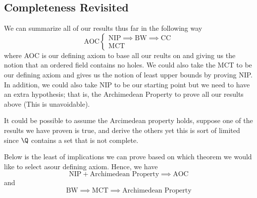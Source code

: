 \subsection{Completeness Revisited}

We can summarize all of our results thus far in the following way 
\[ \text{AOC} 
\begin{cases}
    \text{NIP} \implies \text{BW} \implies \text{CC} \\ 
    \text{MCT} 
\end{cases}   \]
where AOC is our defining axiom to base all our reults on and giving us the notion that an ordered field contains no holes. We could also take the MCT to be our defining axiom and gives us the notion of least upper bounds by proving NIP. In addition, we could also take NIP to be our starting point but we need to have an extra hypothesis; that is, the Archimedean Property to prove all our results above (This is unavoidable).

It could be possible to assume the Arcimedean property holds, suppose one of the results we have proven is true, and derive the others yet this is sort of limited since \( \Q \) contains a set that is not complete. 

Below is the least of implications we can prove based on which theorem we would like to select asour defining axiom. Hence, we have
\[ \text{NIP} + \text{Archimedean Property} \implies \text{AOC} \] and 
\[ \text{BW} \implies \text{MCT} \implies \text{Archimedean Property}\]


